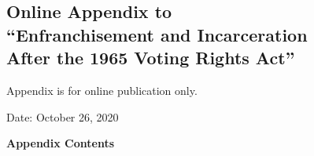 \documentclass[12pt]{article}
\begin{document}
\singlespacing
\clearpage
\newpage









\clearpage
\newpage
\normalsize

\appendix




\clearpage
{}

\begin{center}
\singlespacing
	\section*{\normalfont \LARGE Online Appendix to \\``Enfranchisement and Incarceration \\ After the 1965 Voting Rights Act''}

	\normalsize
	\vspace{.2in}
	{Appendix is for online publication only.}


	\large
	\vspace{.25in}
	Date: October 26, 2020

\end{center}


\vspace{.4in}
\singlespacing
\normalsize

\setcounter{footnote}{0}
\setcounter{equation}{0}

\renewcommand{\thesubsection}{\Alph{subsection}}


\vspace{.2in}
\noindent \textbf{Appendix Contents} \\
\end{document}

